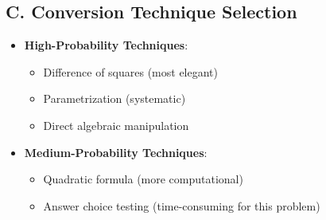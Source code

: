 \documentclass[12pt]{article}
\begin{document}
\begin{tacticalbox}
\subsection*{C. Conversion Technique Selection}
\begin{itemize}[leftmargin=*]
    \item \textbf{High-Probability Techniques}:
    \begin{itemize}
        \item Difference of squares (most elegant)
        \item Parametrization (systematic)
        \item Direct algebraic manipulation
    \end{itemize}
    \item \textbf{Medium-Probability Techniques}:
    \begin{itemize}
        \item Quadratic formula (more computational)
        \item Answer choice testing (time-consuming for this problem)
    \end{itemize}
\end{itemize}
\end{tacticalbox}
\end{document}
